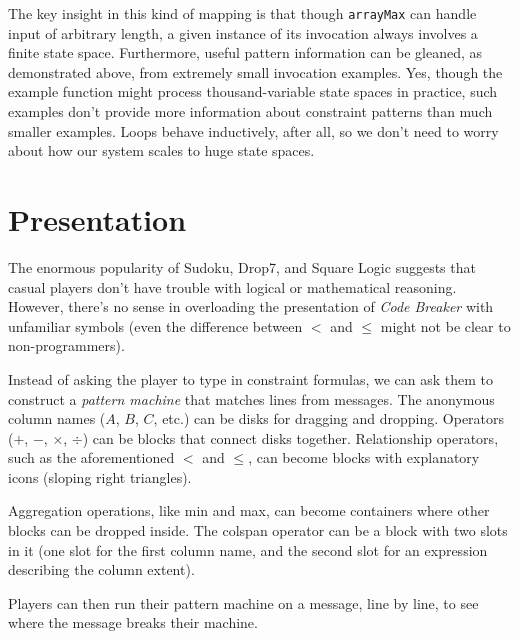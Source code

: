 \documentclass[12pt]{article}
\begin{document}
The key insight in this kind of mapping is that though {\tt arrayMax} can handle input of arbitrary length, a given instance of its invocation always involves a finite state space.  Furthermore, useful pattern information can be gleaned, as demonstrated above, from extremely small invocation examples.  Yes, though the example function might process thousand-variable state spaces in practice, such examples don't provide more information about constraint patterns than much smaller examples.  Loops behave inductively, after all, so we don't need to worry about how our system scales to huge state spaces.

\section{Presentation}
The enormous popularity of Sudoku, Drop7, and Square Logic suggests that casual players don't have trouble with logical or mathematical reasoning.  However, there's no sense in overloading the presentation of {\it Code Breaker} with unfamiliar symbols (even the difference between $<$ and $\leq$ might not be clear to non-programmers).

Instead of asking the player to type in constraint formulas, we can ask them to construct a {\it pattern machine} that matches lines from messages.  The anonymous column names ($A$, $B$, $C$, etc.) can be disks for dragging and dropping.  Operators ($+$, $-$, $\times$, $\div$) can be blocks that connect disks together.  Relationship operators, such as the aforementioned $<$ and $\leq$, can become blocks with explanatory icons (sloping right triangles).

Aggregation operations, like min and max, can become containers where other blocks can be dropped inside.  The colspan operator can be a block with two slots in it (one slot for the first column name, and the second slot for an expression describing the column extent).

Players can then run their pattern machine on a message, line by line, to see where the message breaks their machine.  
\end{document}
